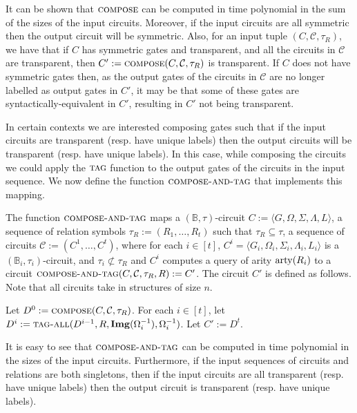 \documentclass[../paper.tex]{subfiles}
\begin{document}
It can be shown that ${\normalfont\textsc{compose}}$ can be computed in time polynomial in the
sum of the sizes of the input circuits. Moreover, if the input circuits are all
symmetric then the output circuit will be symmetric. Also, for an input tuple
$(C, \mathcal{C}, \tau_R)$, we have that if $C$ has symmetric gates and
transparent, and all the circuits in $\mathcal{C}$ are transparent, then $C' :=
{\normalfont\textsc{compose}}(C, \mathcal{C}, \tau_R)$ is transparent. If $C$ does not have
symmetric gates then, as the output gates of the circuits in $\mathcal{C}$ are
no longer labelled as output gates in $C'$, it may be that some of these gates
are syntactically-equivalent in $C'$, resulting in $C'$ not being transparent.

In certain contexts we are interested composing gates such that if the input circuits are
transparent (resp. have unique labels) then the output circuits will be
transparent (resp. have unique labels). In this case, while composing the
circuits we could apply the ${\normalfont\textsc{tag}}$ function to the output gates of the
circuits in the input sequence. We now define the function
${\normalfont\textsc{compose-and-tag}}$ that implements this mapping.

\begin{definition}
  The function ${\normalfont\textsc{compose-and-tag}}$ maps a $(\mathbb{B}, \tau)$-circuit $C :=
  \langle G, \Omega, \Sigma, \Lambda, L \rangle$, a sequence of relation symbols
  $\tau_R := (R_1, \ldots, R_t)$ such that $\tau_R \subseteq \tau$, a sequence
  of circuits $\mathcal{C} := ( C^1, \ldots, C^t)$, where for each $i \in [t]$,
  $C^i = \langle G_i, \Omega_i, \Sigma_i, \Lambda_i, L_i \rangle$ is a
  $(\mathbb{B}_i, \tau_i)$-circuit, and $\tau_i \not\subset \tau_R$ and $C^i$
  computes a query of arity $\mathrm{arty}(R_i)$ to a circuit ${\normalfont\textsc{compose-and-tag}}(C,
  \mathcal{C}, \tau_R, R) := C'$. The circuit $C'$ is defined as follows. Note
  that all circuits take in structures of size $n$.
  
  Let $D^0 := {\normalfont\textsc{compose}}(C, \mathcal{C}, \tau_R)$. For each $i \in [t]$, let
  $D^{i} := {\normalfont\textsc{tag-all}}(D^{i-1}, R, \text{\textbf{Img}}(\Omega^{-1}_i), \Omega^{-1}_i)$. Let
  $C' := D^t$.
\end{definition}

It is easy to see that ${\normalfont\textsc{compose-and-tag}}$ can be computed in time polynomial
in the sizes of the input circuits. Furthermore, if the input sequences of
circuits and relations are both singletons, then if the input circuits are all
transparent (resp. have unique labels) then the output circuit is transparent
(resp. have unique labels).
\end{document}
